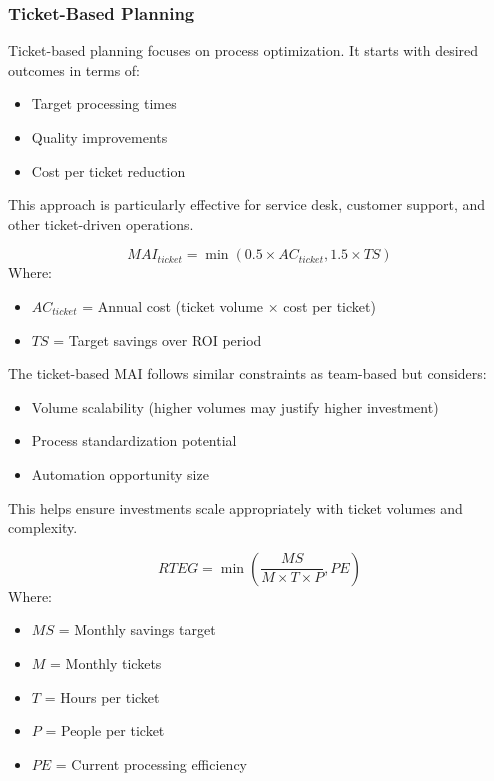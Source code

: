 \documentclass[12pt,a4paper]{article}
\newenvironment{definition}[1]
{\begin{mdframed}[style=definitionstyle,frametitle={Definition: #1}]}
{\end{mdframed}}
\newenvironment{explanation}
{\begin{mdframed}[style=explanationstyle,frametitle={Explanation}]}
{\end{mdframed}}
\newenvironment{observation}
{\begin{mdframed}[style=observationstyle,frametitle={Observation}]}
{\end{mdframed}}
\begin{document}
\subsubsection{Ticket-Based Planning}

\begin{explanation}
Ticket-based planning focuses on process optimization. It starts with desired outcomes in terms of:
\begin{itemize}
    \item Target processing times
    \item Quality improvements
    \item Cost per ticket reduction
\end{itemize}
This approach is particularly effective for service desk, customer support, and other ticket-driven operations.
\end{explanation}

\begin{definition}{Maximum Allowable Investment (Ticket)}
\[
MAI_{ticket} = \min(0.5 \times AC_{ticket}, 1.5 \times TS)
\]
Where:
\begin{itemize}
    \item $AC_{ticket}$ = Annual cost (ticket volume × cost per ticket)
    \item $TS$ = Target savings over ROI period
\end{itemize}
\end{definition}

\begin{observation}
The ticket-based MAI follows similar constraints as team-based but considers:
\begin{itemize}
    \item Volume scalability (higher volumes may justify higher investment)
    \item Process standardization potential
    \item Automation opportunity size
\end{itemize}
This helps ensure investments scale appropriately with ticket volumes and complexity.
\end{observation}

\begin{definition}{Required Ticket Efficiency Gains}
\[
RTEG = \min\left(\frac{MS}{M \times T \times P}, PE\right)
\]
Where:
\begin{itemize}
    \item $MS$ = Monthly savings target
    \item $M$ = Monthly tickets
    \item $T$ = Hours per ticket
    \item $P$ = People per ticket
    \item $PE$ = Current processing efficiency
\end{itemize}
\end{definition}
\end{document}
